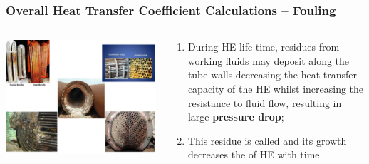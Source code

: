 \documentclass[10pt,compress,unknownkeysallowed]{beamer}
\begin{document}
\begin{frame}
  \frametitle{Overall Heat Transfer Coefficient Calculations -- Fouling}
    \begin{columns}
       \begin{column}[l]{0.5\linewidth}
         \includegraphics[width=1.1\columnwidth,clip]{./Pics/HE_Fouling}
       \end{column}
       \begin{column}[l]{0.5\linewidth}
          \begin{enumerate}\scriptsize
              \item<1-> During HE life-time, residues from working fluids may deposit along the tube walls decreasing the heat transfer capacity of the HE whilst increasing the resistance to fluid flow, resulting in large {\bf pressure drop};
              \item<1-> This residue is called  and its growth decreases the  of HE with time.
          \end{enumerate}
       \end{column}      
    \end{columns}


\end{frame}
\end{document}
